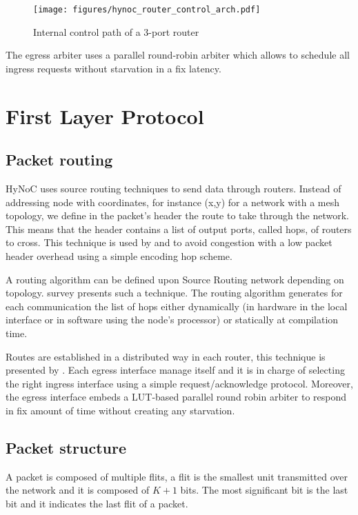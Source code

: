 \begin{figure}[H]
  \centering
  \texttt{[image: figures/hynoc\_router\_control\_arch.pdf]}
  \caption{Internal control path of a 3-port router}
  \label{hynoc_router_control_arch}
\end{figure}

The egress arbiter uses a parallel round-robin arbiter which allows to schedule all ingress requests without starvation
in a fix latency.

\section{First Layer Protocol}

\subsection{Packet routing}

HyNoC uses source routing techniques to send data through routers. Instead of addressing node with coordinates, for
instance (x,y) for a network with a mesh topology, we define in the packet's header the route to take through the
network. This means that the header contains a list of output ports, called hops, of routers to cross. This technique
is used by \cite{LIW2007} and \cite{MUB2010} to avoid congestion with a low packet header overhead using a simple encoding hop
scheme.

A routing algorithm can be defined upon Source Routing network depending on topology. \cite{MUB2010} survey presents such a
technique. The routing algorithm generates for each communication the list of hops either dynamically (in hardware in
the local interface or in software using the node's processor) or statically at compilation time.

Routes are established in a distributed way in each router, this technique is presented by \cite{PON2011}. Each egress
interface manage itself and it is in charge of selecting the right ingress interface using a simple request/acknowledge
protocol. Moreover, the egress interface embeds a LUT-based parallel round robin arbiter to respond in fix amount of
time without creating any starvation.


\subsection{Packet structure}

A packet is composed of multiple flits, a flit is the smallest unit transmitted over the network and it is composed of
$K+1$ bits. The most significant bit is the last bit and it indicates the last flit of a packet.

